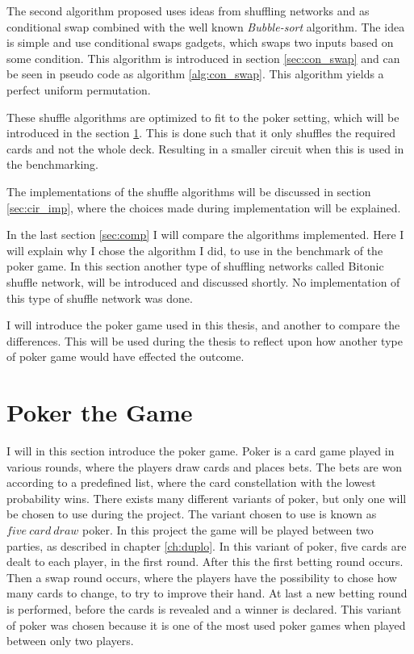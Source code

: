 \documentclass[twoside,11pt,openright]{report}
\begin{document}
The second algorithm proposed uses ideas from shuffling networks and \cite{psi} as conditional swap combined with the well known \textit{Bubble-sort} algorithm. The idea is simple and use conditional swaps gadgets, which swaps two inputs based on some condition. This algorithm is introduced in section \ref{sec:con_swap} and can be seen in pseudo code as algorithm \ref{alg:con_swap}. This algorithm yields a perfect uniform permutation.

These shuffle algorithms are optimized to fit to the poker setting, which will be introduced in the section \ref{sec:poker}. This is done such that it only shuffles the required cards and not the whole deck. Resulting in a smaller circuit when this is used in the benchmarking.

The implementations of the shuffle algorithms will be discussed in section \ref{sec:cir_imp}, where the choices made during implementation will be explained.

In the last section \ref{sec:comp} I will compare the algorithms implemented. Here I will explain why I chose the algorithm I did, to use in the benchmark of the poker game. In this section another type of shuffling networks called Bitonic shuffle network, will be introduced and discussed shortly. No implementation of this type of shuffle network was done.

\bigskip

I will introduce the poker game used in this thesis, and another to compare the differences. This will be used during the thesis to reflect upon how another type of poker game would have effected the outcome.

\section{Poker the Game}
\label{sec:poker}
I will in this section introduce the poker game. Poker is a card game played in various rounds, where the players draw cards and places bets. The bets are won according to a predefined list, where the card constellation with the lowest probability wins. There exists many different variants of poker, but only one will be chosen to use during the project. The variant chosen to use is known as $five~card~draw$ poker. In this project the game will be played between two parties, as described in chapter \ref{ch:duplo}. In this variant of poker, five cards are dealt to each player, in the first round. After this the first betting round occurs. Then a swap round occurs, where the players have the possibility to chose how many cards to change, to try to improve their hand. At last a new betting round is performed, before the cards is revealed and a winner is declared. This variant of poker was chosen because it is one of the most used poker games when played between only two players.
\end{document}

